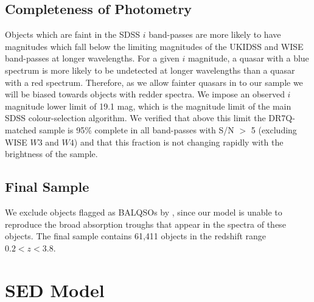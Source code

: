 \subsection{Completeness of Photometry}

Objects which are faint in the SDSS $i$ band-passes are more likely to have magnitudes which fall below the limiting magnitudes of the UKIDSS and WISE band-passes at longer wavelengths. 
For a given $i$ magnitude, a quasar with a blue spectrum is more likely to be undetected at longer wavelengths than a quasar with a red spectrum. 
Therefore, as we allow fainter quasars in to our sample we will be biased towards objects with redder spectra.
We impose an observed $i$ magnitude lower limit of 19.1 mag, which is the magnitude limit of the main SDSS colour-selection algorithm. 
We verified that above this limit the DR7Q-matched sample is 95\% complete in all band-passes with S/N $>$ 5 (excluding WISE $W3$ and $W4$) and that this fraction is not changing rapidly with the brightness of the sample. 

\subsection{Final Sample}

We exclude objects flagged as BALQSOs by \citet{shen11}, since our model is unable to reproduce the broad absorption troughs that appear in the spectra of these objects. 
The final sample contains 61,411 objects in the redshift range $0.2 < z < 3.8$. 

\section{SED Model}


